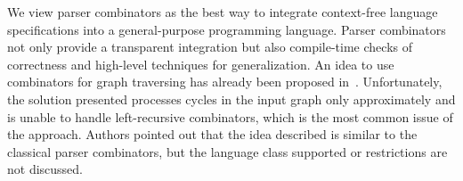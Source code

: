 
We view parser combinators as the best way to integrate context-free language specifications into a general-purpose programming language. Parser combinators not only provide a transparent integration but also compile-time checks of correctness and high-level techniques for generalization. An idea to use combinators for graph traversing has already been proposed in~\cite{ScalaGraphParsing}. Unfortunately, the solution presented processes cycles in the input graph only approximately and is unable to handle left-recursive combinators, which is the most common issue of the approach. Authors pointed out that the idea described is similar to the classical parser combinators, but the language class supported or restrictions are not discussed.



